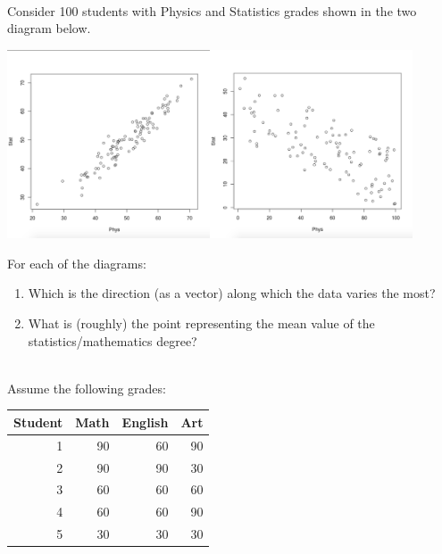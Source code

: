 \documentclass[10pt]{article}
\begin{document}
\\
Consider 100 students with Physics and Statistics grades shown in the two diagram below. 

\includegraphics[width=6cm]{1.png}\includegraphics[width=6cm]{2.png}

For each of the diagrams:
\begin{enumerate}
\item Which is the direction (as a vector) along which the data varies the most?
\item What is (roughly) the point representing the mean value of the statistics/mathematics degree?
\end{enumerate}


\\
Assume the following grades:

\begin{center}
\begin{tabular}{rrrr}
Student & Math & English & Art\\
\hline
1 & 90 & 60 & 90\\
2 & 90 & 90 & 30\\
3 & 60 & 60 & 60\\
4 & 60 & 60 & 90\\
5 & 30 & 30 & 30\\
\hline
\end{tabular}
\end{center}
\end{document}
